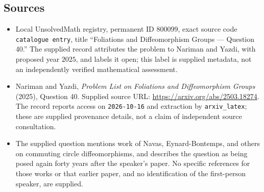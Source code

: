 \documentclass[11pt]{article}
\begin{document}
\subsection{Sources}
\begin{itemize}
\item Local UnsolvedMath registry, permanent ID \(800099\), exact source code \texttt{catalogue entry}, title ``Foliations and Diffeomorphism Groups --- Question 40.'' The supplied record attributes the problem to Nariman and Yazdi, with proposed year \(2025\), and labels it open; this label is supplied metadata, not an independently verified mathematical assessment.
\item Nariman and Yazdi, \emph{Problem List on Foliations and Diffeomorphism Groups} (2025), Question 40. Supplied source URL: \url{https://arxiv.org/abs/2503.18274}. The record reports access on \texttt{2026-10-16} and extraction by \texttt{arxiv\_latex}; these are supplied provenance details, not a claim of independent source consultation.
\item The supplied question mentions work of Navas, Eynard-Bontemps, and others on commuting circle diffeomorphisms, and describes the question as being posed again forty years after the speaker's paper. No specific references for those works or that earlier paper, and no identification of the first-person speaker, are supplied.
\end{itemize}
\end{document}

